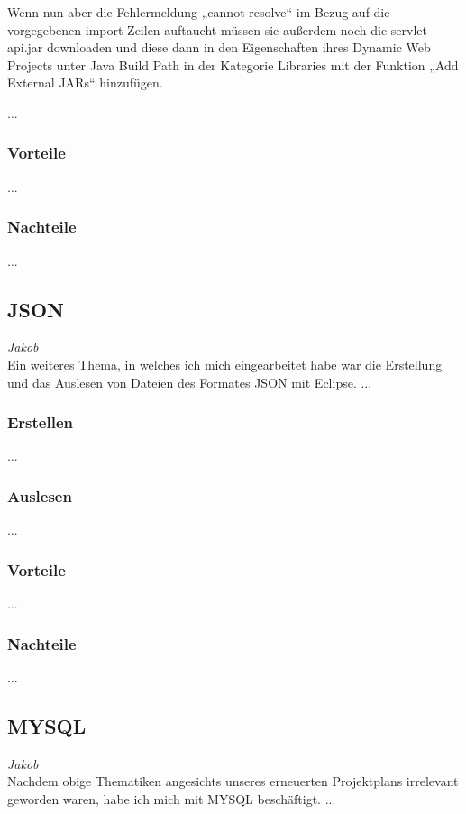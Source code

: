 \documentclass[12pt,a4paper,bibliography=totocnumbered,listof=totocnumbered]{scrartcl}
\begin{document}
Wenn nun aber die Fehlermeldung  „cannot resolve“ im Bezug auf die vorgegebenen import-Zeilen auftaucht müssen sie außerdem noch die servlet-api.jar downloaden und diese dann in den Eigenschaften ihres Dynamic Web Projects unter Java Build Path in der Kategorie Libraries mit der Funktion „Add External JARs“ hinzufügen. 

...

\subsubsection{Vorteile}
...

\subsubsection{Nachteile}
...

\subsection{JSON}
\emph{Jakob}\\
Ein weiteres Thema, in welches ich mich eingearbeitet habe war die Erstellung und das Auslesen von Dateien
des Formates JSON mit Eclipse.
...

\subsubsection{Erstellen}
...

\subsubsection{Auslesen}
...

\subsubsection{Vorteile}
...

\subsubsection{Nachteile}
...

\subsection{MYSQL}
\emph{Jakob}\\
Nachdem obige Thematiken angesichts unseres erneuerten Projektplans irrelevant geworden waren, habe ich mich 
mit MYSQL beschäftigt.
...
\end{document}
